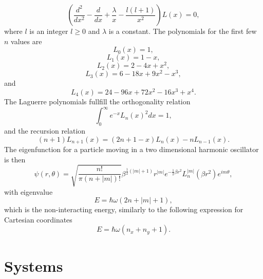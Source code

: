 \documentclass[../main.tex]{subfiles}
\begin{document}
\begin{equation}
    \left( \frac{d^2}{dx^2} - \frac{d}{dx} + \frac{\lambda}{x} - \frac{l(l+1)}{x^2} \right) L(x) = 0,
\end{equation}
where $l$ is an integer $l \geq 0$ and $\lambda$ is a constant. The polynomials for the first few $n$ values are
\begin{equation}
    L_0(x) = 1,
\end{equation}
\begin{equation}
    L_1(x) = 1-x,
\end{equation}
\begin{equation}
    L_2(x) = 2 - 4x + x^2,
\end{equation}
\begin{equation}
    L_3(x) = 6 - 18x + 9x^2 - x^3,
\end{equation}
and
\begin{equation}
    L_4(x) = 24 - 96x + 72x^2 -16x^3 + x^4.
\end{equation}
The Laguerre polynomials fullfill the orthogonality relation 
\begin{equation}
    \int_0^\infty e^{-x} L_n(x)^2 dx = 1,
\end{equation}
and the recursion relation 
\begin{equation}
    (n+1) L_{n+1}(x) = (2n + 1 - x) L_n(x) - n L_{n-1}(x).
\end{equation}
The eigenfunction for a particle moving in a two dimensional harmonic oscillator is then 
\begin{equation}
    \psi(r, \theta) = \sqrt{\frac{n!}{\pi (n + |m|)!}} \beta^{\frac{1}{2}(|m|+1)} r^{|m|} e^{-\frac{1}{2}\beta r^2} L_n^{|m|}(\beta r^2) e^{im\theta},
\end{equation}
with eigenvalue 
\begin{equation}
    E = \hbar \omega (2n + |m| + 1),
\end{equation}
which is the non-interacting energy, similarly to the following expression for Cartesian coordinates 
\begin{equation}
    E = \hbar \omega (n_x + n_y + 1).
\end{equation}


\chapter{Systems}
\end{document}
